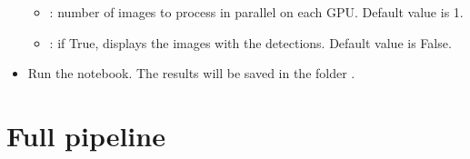 \documentclass[letterpaper,10pt,english]{sphinxmanual}
\begin{document}
\begin{itemize}
\begin{itemize}
\item {} 
\sphinxAtStartPar
{}: number of images to process in parallel on each GPU. Default value is 1.

\item {} 
\sphinxAtStartPar
{}: if True, displays the images with the detections. Default value is False.

\end{itemize}

\item {} 
\sphinxAtStartPar
Run the notebook. The results will be saved in the folder .

\end{itemize}


\section{Full pipeline}
\end{document}
